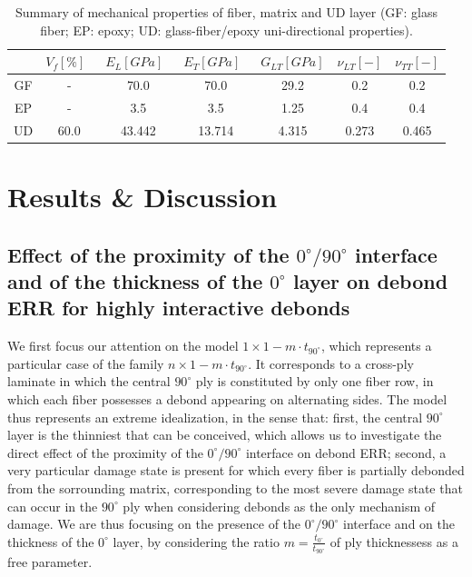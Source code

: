 \begin{table}[!h]
 \centering
 \caption{Summary of mechanical properties of fiber, matrix and UD layer (GF: glass fiber; EP: epoxy; UD: glass-fiber/epoxy uni-directional properties).}%
 \begin{tabular}{ccccccc}
\small& \small\textbf{$V_{f}\left[\%\right]$}\  &\small \textbf{$E_{L}\left[GPa\right]$}\ & \small\textbf{$E_{T}\left[GPa\right]$}\  & \small\textbf{$G_{LT}\left[GPa\right]$} &\small\textbf{$\nu_{LT}\left[-\right]$} &\small \textbf{$\nu_{TT}\left[-\right]$} \\
\midrule
\small GF &\small-   &\small 70.0 &\small 70.0  &\small 29.2 &\small 0.2  &\small 0.2\\
\small EP    &-&\small 3.5 &\small 3.5   &\small 1.25 &\small  0.4&\small 0.4\\
\small UD&\small60.0&\small43.442&\small13.714&\small 4.315&\small 0.273&\small0.465\\
\end{tabular}
\label{paperC:tab:phaseprop}
\end{table}


\section{Results \& Discussion}

\subsection{Effect of the proximity of the $0^{\circ}/90^{\circ}$ interface and of the thickness of the $0^{\circ}$ layer on debond ERR for highly interactive debonds}\label{paperC:subsec:thickness}

We first focus our attention on the model $1\times 1-m\cdot t_{90^{\circ}}$, which represents a particular case of the family $n\times 1-m\cdot t_{90^{\circ}}$. It corresponds to a cross-ply laminate in which the central $90^{\circ}$ ply is constituted by only one fiber row, in which each fiber possesses a debond appearing on alternating sides. The model thus represents an extreme idealization, in the sense that: first, the central $90^{\circ}$ layer is the thinniest that can be conceived, which allows us to investigate the direct effect of the proximity of the $0^{\circ}/90^{\circ}$ interface on debond ERR; second, a very particular damage state is present for which every fiber is partially debonded from the sorrounding matrix, corresponding to the most severe damage state that can occur in the $90^{\circ}$ ply when considering debonds as the only mechanism of damage. We are thus focusing on the presence of the $0^{\circ}/90^{\circ}$ interface and on the thickness of the $0^{\circ}$ layer, by considering the ratio $m=\frac{t_{0^{\circ}}}{t_{90^{\circ}}}$ of ply thicknessess as a free parameter.\\

